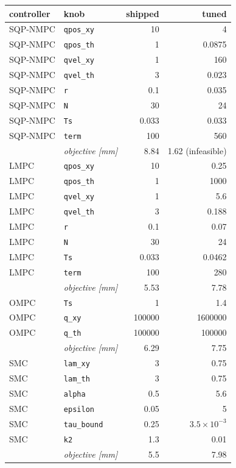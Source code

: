 \begin{tabular}{llrr}
\toprule
controller & knob & shipped & tuned \\
\midrule
SQP-NMPC & \texttt{qpos\_xy} & 10 & 4 \\
SQP-NMPC & \texttt{qpos\_th} & 1 & 0.0875 \\
SQP-NMPC & \texttt{qvel\_xy} & 1 & 160 \\
SQP-NMPC & \texttt{qvel\_th} & 3 & 0.023 \\
SQP-NMPC & \texttt{r} & 0.1 & 0.035 \\
SQP-NMPC & \texttt{N} & 30 & 24 \\
SQP-NMPC & \texttt{Ts} & 0.033 & 0.033 \\
SQP-NMPC & \texttt{term} & 100 & 560 \\
 & \emph{objective [mm]} & 8.84 & 1.62 (infeasible) \\
\addlinespace
LMPC & \texttt{qpos\_xy} & 10 & 0.25 \\
LMPC & \texttt{qpos\_th} & 1 & 1000 \\
LMPC & \texttt{qvel\_xy} & 1 & 5.6 \\
LMPC & \texttt{qvel\_th} & 3 & 0.188 \\
LMPC & \texttt{r} & 0.1 & 0.07 \\
LMPC & \texttt{N} & 30 & 24 \\
LMPC & \texttt{Ts} & 0.033 & 0.0462 \\
LMPC & \texttt{term} & 100 & 280 \\
 & \emph{objective [mm]} & 5.53 & 7.78 \\
\addlinespace
OMPC & \texttt{Ts} & 1 & 1.4 \\
OMPC & \texttt{q\_xy} & 100000 & 1600000 \\
OMPC & \texttt{q\_th} & 100000 & 100000 \\
 & \emph{objective [mm]} & 6.29 & 7.75 \\
\addlinespace
SMC & \texttt{lam\_xy} & 3 & 0.75 \\
SMC & \texttt{lam\_th} & 3 & 0.75 \\
SMC & \texttt{alpha} & 0.5 & 5.6 \\
SMC & \texttt{epsilon} & 0.05 & 5 \\
SMC & \texttt{tau\_bound} & 0.25 & $3.5\times10^{-3}$ \\
SMC & \texttt{k2} & 1.3 & 0.01 \\
 & \emph{objective [mm]} & 5.5 & 7.98 \\
\bottomrule
\end{tabular}
